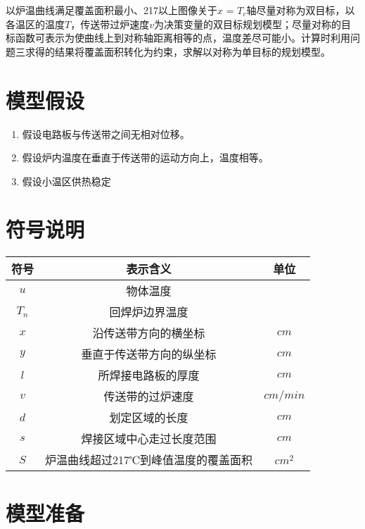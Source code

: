 \documentclass[withoutpreface,bwprint]{cumcmthesis} %
\numberwithin{equation}{subsection}
\begin{document}
以炉温曲线满足覆盖面积最小、217\textcelsius 以上图像关于$x$ = $T_{c}$轴尽量对称为双目标，以各温区的温度$T$，传送带过炉速度$v$为决策变量的双目标规划模型；尽量对称的目标函数可表示为使曲线上到对称轴距离相等的点，温度差尽可能小。计算时利用问题三求得的结果将覆盖面积转化为约束，求解以对称为单目标的规划模型。
\section{模型假设}

\begin{enumerate}[label=(\arabic*)]
	\item
	假设电路板与传送带之间无相对位移。
	\item
	假设炉内温度在垂直于传送带的运动方向上，温度相等。
	\item
	假设小温区供热稳定

	
\end{enumerate}






\section{符号说明}


\begin{table}[h]
	\centering
	\begin{tabular}{ccc}
		\toprule[1.5pt]
		符号   &    表示含义 &   单位  \\
		\midrule[1pt]
		$u$ & 物体温度 & \textcelsius  \\
		$T_{n}$ & 回焊炉边界温度 & \textcelsius \\
		$x$& 沿传送带方向的横坐标 &  $cm$ \\
		$y$& 垂直于传送带方向的纵坐标 &  $cm$   \\
		$l$& 所焊接电路板的厚度 &   $cm$  \\
		$v$& 传送带的过炉速度 &   $cm/min$  \\
		$d$& 划定区域的长度 &    $cm$ \\
		$s$& 焊接区域中心走过长度范围 &   $cm$  \\
		$S$& 炉温曲线超过217℃到峰值温度的覆盖面积 &   $cm^2$  \\
		\bottomrule[1.5pt]
		
	\end{tabular}
\end{table}

\section{模型准备}
\end{document}
